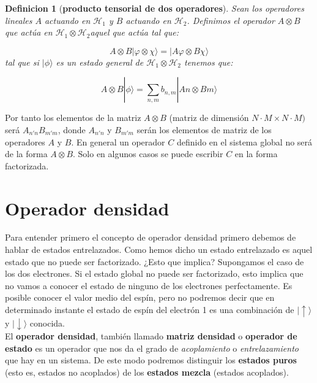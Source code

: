 \documentclass[12pt,a4paper]{book}
\numberwithin{equation}{chapter}
\numberwithin{figure}{chapter}
\newcommand{\eup}{\mid \uparrow \rangle}
\newcommand{\edw}{\mid \downarrow \rangle}
\newcommand{\Hcal}{\mathcal{H}}
\newtheorem{definition}{Definicion}[section]
\begin{document}
\begin{definition}[\textbf{producto tensorial de dos operadores}]
Sean los operadores lineales $A$ actuando en $\Hcal_1$ y $B$ actuando en $\Hcal_2$. Definimos el operador $A\otimes B$ que actúa en $\Hcal_ 1 \otimes \Hcal_2$aquel que actúa tal que:

\begin{equation}
A \otimes B |\varphi \otimes \chi \rangle = |A \varphi \otimes B \chi  \rangle
\end{equation}
tal que si $|\phi\rangle$ es un estado general de $\Hcal_ 1 \otimes \Hcal_2$ tenemos que:

\begin{equation}
A \otimes B | \phi \rangle = \sum_{n,m} b_{n,m} |A n \otimes B m \rangle
\end{equation}
\end{definition}

Por tanto los elementos de la matriz $A \otimes B$ (matriz de dimensión $N\cdot M \times N \cdot M)$ será $A_{n'n} B_{m'm}$, donde $A_{n'n}$ y $B_{m'm}$ serán los elementos de matriz de los operadores $A$ y $B$. En general un operador $C$ definido en el sistema global no será de la forma $A\otimes B$. Solo en algunos casos se puede escribir $C$ en la forma factorizada.


\section{Operador densidad}

Para entender primero el concepto de operador densidad primero debemos de hablar de estados entrelazados. Como hemos dicho un estado entrelazado es aquel estado que no puede ser factorizado. ¿Esto que implica? Supongamos el caso de los dos electrones. Si el estado global no puede ser factorizado, esto implica que no vamos a conocer el estado de ninguno de los electrones perfectamente. Es posible conocer el valor medio del espín, pero no podremos decir que en determinado instante el estado de espín del electrón 1 es una combinación de $\eup$ y $\edw$ conocida. \\

El \textbf{operador densidad}, también llamado \textbf{matriz densidad} o \textbf{operador de estado} es un operador que nos da el grado de \textit{acoplamiento} o \textit{entrelazamiento} que hay en un sistema. De este modo podremos distinguir los \textbf{estados puros} (esto es, estados no acoplados) de los \textbf{estados mezcla} (estados acoplados). \\
\end{document}
